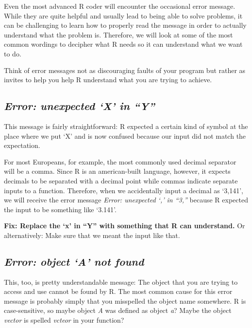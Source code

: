 \documentclass[
]{book}
\begin{document}
Even the most advanced R coder will encounter the occasional error message.
While they are quite helpful and usually lead to being able to solve problems, it can be challenging to learn how to properly read the message in order to actually understand what the problem is.
Therefore, we will look at some of the most common wordings to decipher what R needs so it can understand what we want to do.

Think of error messages not as discouraging faults of your program but rather as invites to help you help R understand what you are trying to achieve.

\subsection*{\texorpdfstring{\emph{Error: unexpected `X' in ``Y''}}{Error: unexpected `X' in ``Y''}}\label{error-unexpected-x-in-y}

This message is fairly straightforward:
R expected a certain kind of symbol at the place where we put `X' and is now confused because our input did not match the expectation.

For most Europeans, for example, the most commonly used decimal separator will be a comma.
Since R is an american-built language, however, it expects decimals to be separated with a decimal point while commas indicate separate inputs to a function.
Therefore, when we accidentally input a decimal as `3,141', we will receive the error message \emph{Error: unexpected `,' in ``3,''} because R expected the input to be something like `3.141'.

\textbf{Fix: Replace the `x' in ``Y'' with something that R can understand.} Or alternatively: Make sure that we meant the input like that.

\subsection*{\texorpdfstring{\emph{Error: object `A' not found}}{Error: object `A' not found}}\label{error-object-a-not-found}

This, too, is pretty understandable message:
The object that you are trying to access and use cannot be found by R.
The most common cause for this error message is probably simply that you misspelled the object name somewhere.
R is case-sensitive, so maybe object \emph{A} was defined as object \emph{a}?
Maybe the object \emph{vector} is spelled \emph{vcteor} in your function?
\end{document}
